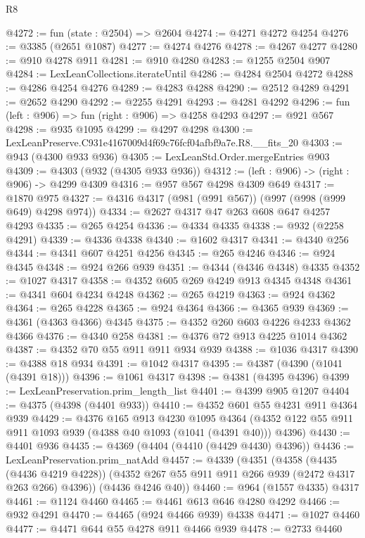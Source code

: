 \begin{lexlean}{R8}
\begin{coremodule}
@4272 := fun (state : @2504) => @2604
@4274 := @4271 @4272 @4254
@4276 := @3385 (@2651 @1087)
@4277 := @4274 @4276
@4278 := @4267 @4277
@4280 := @910 @4278 @911
@4281 := @910 @4280
@4283 := @1255 @2504 @907
@4284 := LexLeanCollections.iterateUntil
@4286 := @4284 @2504 @4272
@4288 := @4286 @4254 @4276
@4289 := @4283 @4288
@4290 := @2512 @4289
@4291 := @2652 @4290
@4292 := @2255 @4291
@4293 := @4281 @4292
@4296 := fun (left : @906) => fun (right : @906) => @4258 @4293
@4297 := @921 @567
@4298 := @935 @1095
@4299 := @4297 @4298
@4300 := LexLeanPreserve.C931e4167009d4f69c76fcf04afbf9a7e.R8.__fits_20
@4303 := @943 (@4300 @933 @936)
@4305 := LexLeanStd.Order.mergeEntries @903
@4309 := @4303 (@932 (@4305 @933 @936))
@4312 := (left : @906) -> (right : @906) -> @4299 @4309
@4316 := @957 @567 @4298 @4309 @649
@4317 := @1870 @975
@4327 := @4316 @4317 (@981 (@991 @567)) (@997 (@998 (@999 @649) @4298 @974))
@4334 := @2627 @4317 @47 @263 @608 @647 @4257 @4293
@4335 := @265 @4254
@4336 := @4334 @4335
@4338 := @932 (@2258 @4291)
@4339 := @4336 @4338
@4340 := @1602 @4317
@4341 := @4340 @256
@4344 := @4341 @607 @4251 @4256
@4345 := @265 @4246
@4346 := @924 @4345
@4348 := @924 @266 @939
@4351 := @4344 (@4346 @4348) @4335
@4352 := @1027 @4317
@4358 := @4352 @605 @269 @4249 @913 @4345 @4348
@4361 := @4341 @604 @4234 @4248
@4362 := @265 @4219
@4363 := @924 @4362
@4364 := @265 @4228
@4365 := @924 @4364
@4366 := @4365 @939
@4369 := @4361 (@4363 @4366) @4345
@4375 := @4352 @260 @603 @4226 @4233 @4362 @4366
@4376 := @4340 @258
@4381 := @4376 @72 @913 @4225 @1014 @4362
@4387 := @4352 @70 @55 @911 @911 @934 @939
@4388 := @1036 @4317
@4390 := @4388 @18 @934
@4391 := @1042 @4317
@4395 := @4387 (@4390 (@1041 (@4391 @18)))
@4396 := @1061 @4317
@4398 := @4381 (@4395 @4396)
@4399 := LexLeanPreservation.prim_length_list
@4401 := @4399 @905 @1207
@4404 := @4375 (@4398 (@4401 @933))
@4410 := @4352 @601 @55 @4231 @911 @4364 @939
@4429 := @4376
    @165
    @913
    @4230
    @1095
    @4364
    (@4352 @122 @55 @911 @911 @1093 @939 (@4388 @40 @1093 (@1041 (@4391 @40))) @4396)
@4430 := @4401 @936
@4435 := @4369 (@4404 (@4410 (@4429 @4430) @4396))
@4436 := LexLeanPreservation.prim_natAdd
@4457 := @4339
    (@4351
      (@4358
        (@4435 (@4436 @4219 @4228))
        (@4352 @267 @55 @911 @911 @266 @939 (@2472 @4317 @263 @266) @4396))
      (@4436 @4246 @40))
@4460 := @964 (@1557 @4335) @4317
@4461 := @1124 @4460
@4465 := @4461 @613 @646 @4280 @4292
@4466 := @932 @4291
@4470 := @4465 (@924 @4466 @939) @4338
@4471 := @1027 @4460
@4477 := @4471 @644 @55 @4278 @911 @4466 @939
@4478 := @2733 @4460

\end{coremodule}
\end{lexlean}

